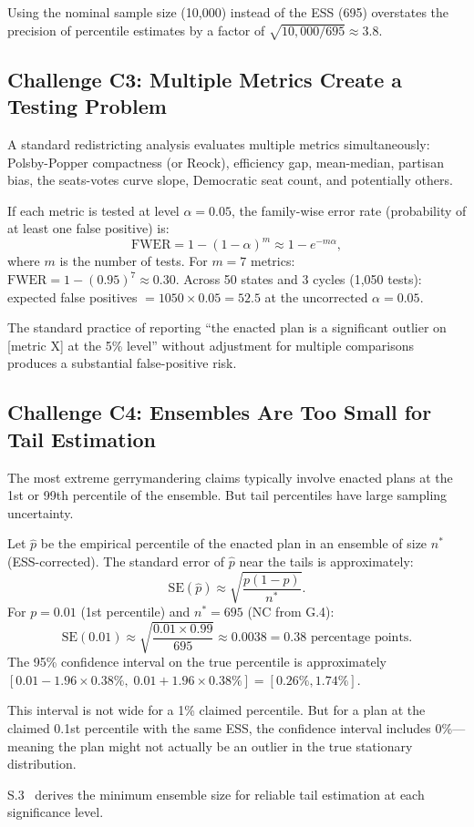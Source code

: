 Using the nominal sample size (10,000) instead of the ESS (695) overstates
the precision of percentile estimates by a factor of $\sqrt{10{,}000 / 695}
\approx 3.8$.

\subsection{Challenge C3: Multiple Metrics Create a Testing Problem}
\label{sec:challenge3}

A standard redistricting analysis evaluates multiple metrics simultaneously:
Polsby-Popper compactness (or Reock), efficiency gap, mean-median, partisan
bias, the seats-votes curve slope, Democratic seat count, and potentially others.

If each metric is tested at level $\alpha = 0.05$, the family-wise error
rate (probability of at least one false positive) is:
\[
  \mathrm{FWER} = 1 - (1 - \alpha)^m \approx 1 - e^{-m\alpha},
\]
where $m$ is the number of tests.
For $m = 7$ metrics: $\mathrm{FWER} = 1 - (0.95)^7 \approx 0.30$.
Across 50 states and 3 cycles (1,050 tests): expected false positives
$= 1050 \times 0.05 = 52.5$ at the uncorrected $\alpha = 0.05$.

The standard practice of reporting ``the enacted plan is a significant
outlier on [metric X] at the 5\% level'' without adjustment for
multiple comparisons produces a substantial false-positive risk.

\subsection{Challenge C4: Ensembles Are Too Small for Tail Estimation}
\label{sec:challenge4}

The most extreme gerrymandering claims typically involve enacted plans
at the 1st or 99th percentile of the ensemble.
But tail percentiles have large sampling uncertainty.

Let $\hat{p}$ be the empirical percentile of the enacted plan in an
ensemble of size $n^*$ (ESS-corrected).
The standard error of $\hat{p}$ near the tails is approximately:
\[
  \mathrm{SE}(\hat{p}) \approx \sqrt{\frac{p(1-p)}{n^*}}.
\]
For $p = 0.01$ (1st percentile) and $n^* = 695$ (NC from G.4):
\[
  \mathrm{SE}(0.01) \approx \sqrt{\frac{0.01 \times 0.99}{695}}
  \approx 0.0038 = 0.38 \text{ percentage points}.
\]
The 95\% confidence interval on the true percentile is approximately
$[0.01 - 1.96 \times 0.38\%, \; 0.01 + 1.96 \times 0.38\%]
= [0.26\%, 1.74\%]$.

This interval is not wide for a 1\% claimed percentile.
But for a plan at the claimed 0.1st percentile with the same ESS,
the confidence interval includes 0\%---meaning the plan might not
actually be an outlier in the true stationary distribution.

S.3~\citep{s3paper} derives the minimum ensemble size for reliable
tail estimation at each significance level.
